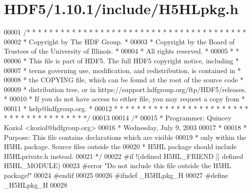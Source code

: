 \hypertarget{_h_d_f5_21_810_81_2include_2_h5_h_lpkg_8h_source}{}\section{H\+D\+F5/1.10.1/include/\+H5\+H\+Lpkg.h}
\label{_h_d_f5_21_810_81_2include_2_h5_h_lpkg_8h_source}

\begin{DoxyCode}
00001 \textcolor{comment}{/* * * * * * * * * * * * * * * * * * * * * * * * * * * * * * * * * * * * * * *}
00002 \textcolor{comment}{ * Copyright by The HDF Group.                                               *}
00003 \textcolor{comment}{ * Copyright by the Board of Trustees of the University of Illinois.         *}
00004 \textcolor{comment}{ * All rights reserved.                                                      *}
00005 \textcolor{comment}{ *                                                                           *}
00006 \textcolor{comment}{ * This file is part of HDF5.  The full HDF5 copyright notice, including     *}
00007 \textcolor{comment}{ * terms governing use, modification, and redistribution, is contained in    *}
00008 \textcolor{comment}{ * the COPYING file, which can be found at the root of the source code       *}
00009 \textcolor{comment}{ * distribution tree, or in https://support.hdfgroup.org/ftp/HDF5/releases.  *}
00010 \textcolor{comment}{ * If you do not have access to either file, you may request a copy from     *}
00011 \textcolor{comment}{ * help@hdfgroup.org.                                                        *}
00012 \textcolor{comment}{ * * * * * * * * * * * * * * * * * * * * * * * * * * * * * * * * * * * * * * */}
00013 
00014 \textcolor{comment}{/*}
00015 \textcolor{comment}{ * Programmer: Quincey Koziol <koziol@hdfgroup.org>}
00016 \textcolor{comment}{ *             Wednesday, July 9, 2003}
00017 \textcolor{comment}{ *}
00018 \textcolor{comment}{ * Purpose:     This file contains declarations which are visible}
00019 \textcolor{comment}{ *              only within the H5HL package. Source files outside the}
00020 \textcolor{comment}{ *              H5HL package should include H5HLprivate.h instead.}
00021 \textcolor{comment}{ */}
00022 \textcolor{preprocessor}{#if !(defined H5HL\_FRIEND || defined H5HL\_MODULE)}
00023 \textcolor{preprocessor}{#error "Do not include this file outside the H5HL package!"}
00024 \textcolor{preprocessor}{#endif}
00025 
00026 \textcolor{preprocessor}{#ifndef \_H5HLpkg\_H}
00027 \textcolor{preprocessor}{#define \_H5HLpkg\_H}
00028 

\end{DoxyCode}
